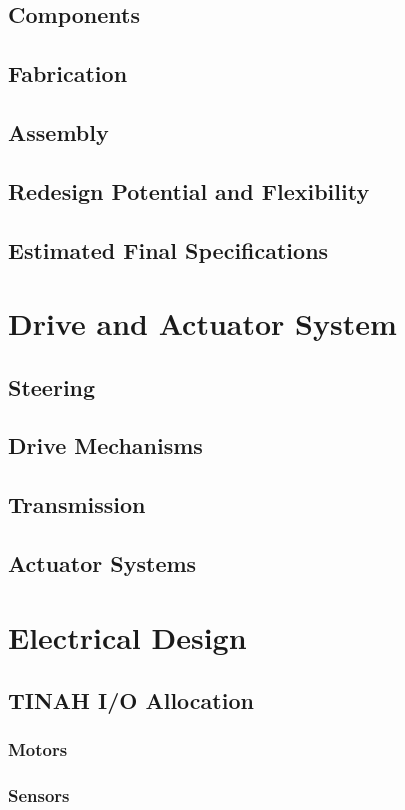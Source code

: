\documentclass[12pt]{article}
\begin{document}
\subsection{Components}
\subsection{Fabrication}
\subsection{Assembly}
\subsection{Redesign Potential and Flexibility}
\subsection{Estimated Final Specifications}

\section{Drive and Actuator System}
\subsection{Steering}
\subsection{Drive Mechanisms}
\subsection{Transmission}
\subsection{Actuator Systems}

\section{Electrical Design}
\subsection{TINAH I/O Allocation}
\subsubsection{Motors}
\subsubsection{Sensors}
\end{document}
